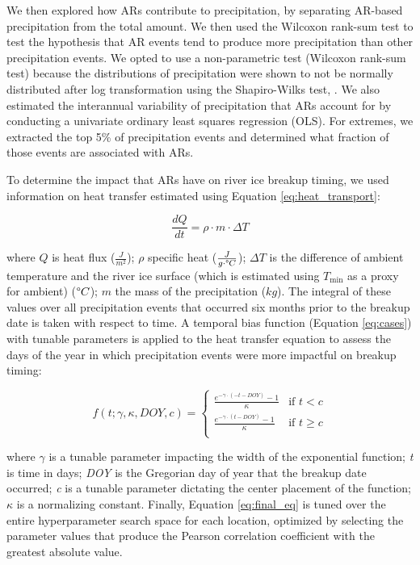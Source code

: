 \documentclass[12pts,draft]{AR_analysis_}
\begin{document}
We then explored how ARs contribute to precipitation, by
separating AR-based precipitation from the total amount. We 
then used the Wilcoxon rank-sum test \cite{Rey2011} to test 
the hypothesis 
that AR events tend to produce more precipitation than other
precipitation events. We opted to use a non-parametric 
test (Wilcoxon rank-sum test) 
because the distributions of precipitation were shown to
not be normally distributed after log transformation using the
Shapiro-Wilks test, \cite{shapiro_wilk_test}. We also estimated
the interannual variability of precipitation that ARs account for by
conducting a univariate ordinary least squares regression (OLS). 
For extremes, we extracted the top 5\% of precipitation events and determined 
what fraction of those events are associated with ARs. 

To determine the impact that ARs have on river ice breakup timing, 
we used information on heat transfer estimated 
using Equation \ref{eq:heat_transport}:

\begin{equation}
\frac{dQ}{dt} = \rho \cdot m \cdot \Delta T 
	\label{eq:heat_transport}
\end{equation}

\noindent where $Q$ is heat flux ($\frac{J}{m^2}$); $\rho$ specific heat 
($\frac{J}{g \cdot \degree C}$); $\Delta T$ is the difference of 
ambient temperature and the river ice surface (which is estimated 
using $T_{\text{min}}$ as a proxy for ambient) ($\degree C$); $m$ 
the mass of the precipitation ($kg$). The integral of these values
over all precipitation events that occurred six months prior to the
breakup date is taken with respect to time. A temporal bias function
(Equation \ref{eq:cases})
with tunable parameters is applied to the heat transfer equation to assess 
the days of the year in which  precipitation events were more 
impactful on breakup timing:

\begin{equation}
	\label{eq:cases}
	f(t; \gamma, \kappa, DOY, c) =
	\begin{cases}
    	\frac{e^{-\gamma \cdot (-t - DOY)} - 1}{\kappa} & \text{if }
        	t < c \\
    	\frac{e^{-\gamma \cdot (t - DOY)} - 1}{\kappa} & \text{if }
        	t \geq c \\
	\end{cases}
\end{equation}

\noindent where $\gamma$ is a tunable parameter impacting the width of
the exponential function; \emph{t} is time in days; 
\emph{DOY} is the Gregorian day of year
that the breakup date occurred; \emph{c} is a tunable parameter dictating the
center placement of the function; $\kappa$ is a normalizing constant.
Finally, Equation \ref{eq:final_eq} is tuned over the entire 
hyperparameter search space for each
location, optimized by selecting the parameter values that produce 
the Pearson correlation 
coefficient with the greatest absolute value. 
\end{document}
